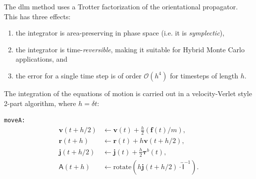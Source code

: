 \documentclass[]{book}
\begin{document}
The {\sc dlm} method uses a Trotter factorization of the orientational
propagator.  This has three effects:
\begin{enumerate}
\item the integrator is area-preserving in phase space (i.e. it is
{\it symplectic}),
\item the integrator is time-{\it reversible}, making it suitable for Hybrid
Monte Carlo applications, and
\item the error for a single time step is of order $\mathcal{O}\left(h^4\right)$
for timesteps of length $h$.
\end{enumerate}

The integration of the equations of motion is carried out in a
velocity-Verlet style 2-part algorithm, where $h= \delta t$:

{\tt moveA:}
\begin{align*}
\mathbf{v}\left(t + h / 2\right)  &\leftarrow  \mathbf{v}(t) 
	+ \frac{h}{2} \left( \mathbf{f}(t) / m \right), \\
%
\mathbf{r}(t + h) &\leftarrow \mathbf{r}(t) 
	+ h  \mathbf{v}\left(t + h / 2 \right), \\
%
\mathbf{j}\left(t + h / 2 \right)  &\leftarrow \mathbf{j}(t) 
	+ \frac{h}{2} \mathbf{\tau}^b(t), \\
%
\mathsf{A}(t + h) &\leftarrow \mathrm{rotate}\left( h \mathbf{j}
	(t + h / 2) \cdot \overleftrightarrow{\mathsf{I}}^{-1} \right).
\end{align*}
\end{document}
